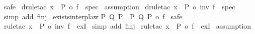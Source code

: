 \begin{isabellebody}
%
\isadelimproof
%
\endisadelimproof
%
\isatagproof
{}\isamarkupfalse%
\ {\isacharparenleft}safe{\isacharparenright}\isanewline
%
\isanewline
{}\isamarkupfalse%
\ {\isacharparenleft}drule{\isacharunderscore}tac\ x\ {\isacharequal}\ {\isachardoublequoteopen}P\ o\ f{\isachardoublequoteclose}\ \ spec{\isacharparenright}\isanewline
{}\isamarkupfalse%
\ {\isacharparenleft}assumption{\isacharparenright}\isanewline
%
\isanewline
{}\isamarkupfalse%
\ {\isacharparenleft}drule{\isacharunderscore}tac\ x\ {\isacharequal}\ {\isachardoublequoteopen}P\ o\ inv\ f{\isachardoublequoteclose}\ \ spec{\isacharparenright}\isanewline
{}\isamarkupfalse%
\ {\isacharparenleft}simp\ add{\isacharcolon}\ f{\isacharunderscore}inj{\isacharparenright}\isanewline
{}\isamarkupfalse%
%
\endisatagproof
{\isafoldproof}%
%
\isadelimproof
\isanewline
%
\endisadelimproof
\isanewline
{}\isamarkupfalse%
\ exists{\isacharunderscore}interp{\isacharunderscore}law{\isacharcolon}\isanewline
{\isachardoublequoteopen}{\isacharparenleft}{\isasymexists}P{\isachardot}\ Q\ P{\isacharparenright}\ {\isacharequal}\ {\isacharparenleft}{\isasymexists}P{\isachardot}\ Q\ {\isacharparenleft}P\ o\ f{\isacharparenright}{\isacharparenright}{\isachardoublequoteclose}\isanewline
%
\isadelimproof
%
\endisadelimproof
%
\isatagproof
{}\isamarkupfalse%
\ {\isacharparenleft}safe{\isacharparenright}\isanewline
%
\isanewline
{}\isamarkupfalse%
\ {\isacharparenleft}rule{\isacharunderscore}tac\ x\ {\isacharequal}\ {\isachardoublequoteopen}P\ o\ inv\ f{\isachardoublequoteclose}\ \ exI{\isacharparenright}\isanewline
{}\isamarkupfalse%
\ {\isacharparenleft}simp\ add{\isacharcolon}\ f{\isacharunderscore}inj{\isacharparenright}\isanewline
%
\isanewline
{}\isamarkupfalse%
\ {\isacharparenleft}rule{\isacharunderscore}tac\ x\ {\isacharequal}\ {\isachardoublequoteopen}P\ o\ f{\isachardoublequoteclose}\ \ exI{\isacharparenright}\isanewline
{}\isamarkupfalse%
\ {\isacharparenleft}assumption{\isacharparenright}\isanewline
{}\isamarkupfalse%
%
\endisatagproof
{\isafoldproof}%
%
\isadelimproof
\isanewline
%
\endisadelimproof
{}\isamarkupfalse%
\isanewline
%
\isadelimtheory
%
\endisadelimtheory
%
\isatagtheory
{}\isamarkupfalse%
%
\endisatagtheory
{\isafoldtheory}%
%
\isadelimtheory
%
\endisadelimtheory
%
\end{isabellebody}%
